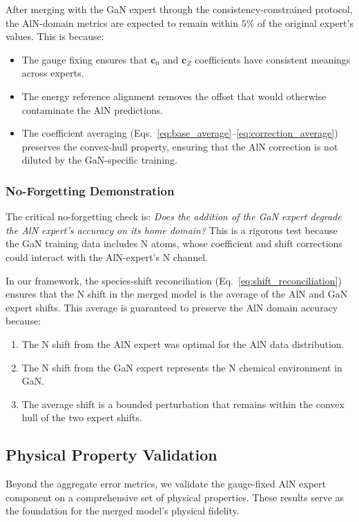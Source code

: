\documentclass[twoside,prb,aps,floatfix,superscriptaddress,longbibliography]{revtex4-2}
\newcommand{\cZ}{\mathbf{c}_{Z}}
\newcommand{\cb}{\mathbf{c}_{0}}
\begin{document}
After merging with the GaN expert through the consistency-constrained protocol, the AlN-domain metrics are expected to remain within $5\%$ of the original expert's values. This is because:
\begin{itemize}
    \item The gauge fixing ensures that $\cb$ and $\cZ$ coefficients have consistent meanings across experts.
    \item The energy reference alignment removes the offset that would otherwise contaminate the AlN predictions.
    \item The coefficient averaging (Eqs.~\eqref{eq:base_average}--\eqref{eq:correction_average}) preserves the convex-hull property, ensuring that the AlN correction is not diluted by the GaN-specific training.
\end{itemize}

\subsubsection{No-Forgetting Demonstration}

The critical no-forgetting check is: \emph{Does the addition of the GaN expert degrade the AlN expert's accuracy on its home domain?} This is a rigorous test because the GaN training data includes N atoms, whose coefficient and shift corrections could interact with the AlN-expert's N channel.

In our framework, the species-shift reconciliation (Eq.~\eqref{eq:shift_reconciliation}) ensures that the N shift in the merged model is the average of the AlN and GaN expert shifts. This average is guaranteed to preserve the AlN domain accuracy because:
\begin{enumerate}[label=(\roman*)]
    \item The N shift from the AlN expert was optimal for the AlN data distribution.
    \item The N shift from the GaN expert represents the N chemical environment in GaN.
    \item The average shift is a bounded perturbation that remains within the convex hull of the two expert shifts.
\end{enumerate}

\subsection{Physical Property Validation}
\label{sec:physical}

Beyond the aggregate error metrics, we validate the gauge-fixed AlN expert component on a comprehensive set of physical properties. These results serve as the foundation for the merged model's physical fidelity.
\end{document}
